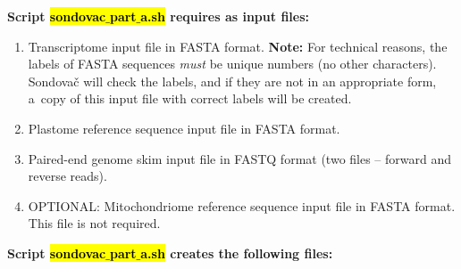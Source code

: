 \documentclass[a4paper, 11pt, twoside]{article}
\renewcommand{\texttt}[1]{\hl{\ttfamily #1}}
\begin{document}
\vspace{10pt}
\textbf{Script \texttt{sondovac$\_$part$\_$a.sh} requires as input files:}

\begin{enumerate}
  \item Transcriptome input file in FASTA format. \textbf{Note:} For technical reasons, the labels of FASTA sequences \textit{must} be unique numbers (no other characters). Sondovač will check the labels, and if they are not in an appropriate form, a~copy of this input file with correct labels will be created.
  \item Plastome reference sequence input file in FASTA format.
  \item Paired-end genome skim input file in FASTQ format (two files -- forward and reverse reads).
  \item OPTIONAL: Mitochondriome reference sequence input file in FASTA format. This file is not required.
\end{enumerate}

\textbf{Script \texttt{sondovac$\_$part$\_$a.sh} creates the following files:}
\label{partb}
\end{document}
